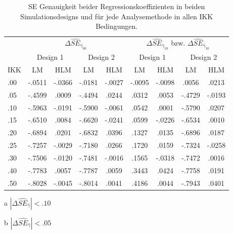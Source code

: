 \documentclass[12pt]{article}\usepackage[]{graphicx}\usepackage[]{color}
\begin{document}
\begin{table}[t!]
\centering
\begin{threeparttable}
\caption{SE Genauigkeit beider Regressionskoeffizienten in beiden Simulationsdesigns und für jede Analysemethode in allen IKK Bedingungen.}
\begin{tabular}{lcccccccc}
\toprule 
& \multicolumn{4}{c}{$\Delta\widehat{SE}_{\widehat{\gamma}_{00}}$} 
& \multicolumn{4}{c}{$\Delta\widehat{SE}_{\widehat{\gamma}_{10}}$ bzw. $\Delta\widehat{SE}_{\widehat{\gamma}_{10}}$}\\
\cmidrule(lr){2-5} \cmidrule(lr){6-9}
		& 	\multicolumn{2}{c}{Design 1} & \multicolumn{2}{c}{Design 2} 
		& \multicolumn{2}{c}{Design 1} & \multicolumn{2}{c}{Design 2}\\
			\cmidrule(lr){2-3}  \cmidrule(lr){4-5} \cmidrule(lr){6-7} \cmidrule(lr){8-9}
IKK 	& 	  LM 			&  HLM 				&  LM 				&  HLM  			&  LM 				&  HLM 				&  LM 				&  HLM\\
		 	\midrule
.00 	&   -.0511\tnote{a}	&   -.0366\tnote{b} &   -.0181\tnote{b}	& 	-.0027\tnote{b} & -.0095\tnote{b} 	& -.0098\tnote{b}	&  .0056\tnote{b} 	&  .0213\tnote{b}\\ 
.05 	&  	-.4599 			&	 .0009\tnote{b}	&	-.4494			&	 .0244\tnote{b}	&  .0312\tnote{b}	&  .0053\tnote{b}	& -.4729			& -.0193\tnote{b}\\ 
.10 	&  	-.5963			&	-.0191\tnote{b}	&	-.5900			&	-.0061\tnote{b}	&  .0542\tnote{a}	&  .0001\tnote{b}	& -.5790			&  .0207\tnote{b}\\ 
.15 	&  	-.6510			&	 .0084\tnote{b}	&	-.6620			&	-.0241\tnote{b}	&  .0599\tnote{a}	& -.0226\tnote{b}	& -.6534			&  .0010\tnote{b}\\ 
.20 	&  	-.6894			&	 .0201\tnote{b}	&	-.6832			&	 .0396\tnote{b}	&  .1327	 		&  .0135\tnote{b}	& -.6896			&  .0187\tnote{b}\\ 
.25 	&   -.7257 			&	-.0029\tnote{b}	&	-.7180			&	 .0266\tnote{b}	&  .1720	 		&  .0159\tnote{b}	& -.7324			& -.0258\tnote{b}\\ 
.30 	&   -.7506 			&	-.0120\tnote{b}	&	-.7481			&	-.0016\tnote{b}	&  .1565	 		& -.0318\tnote{b}	& -.7472			&  .0016\tnote{b}\\ 
.40 	&  	-.7783			&	 .0057\tnote{b}	&	-.7787 			&	 .0059\tnote{b}	&  .3443	 		&  .0424\tnote{b}	& -.7758			&  .0191\tnote{b}\\ 
.50 	&   -.8028 			&	-.0045\tnote{b}	&	-.8014			&	 .0041\tnote{b}	&  .4186	 		&  .0044\tnote{b}	& -.7943			&  .0401\tnote{b}\\  
\bottomrule
\end{tabular}
\label{tab:se_eff_intercept}
\begin{tablenotes}
\item [a] $|\Delta\widehat{SE}_{\widehat{\gamma}}| < .10$
\item [b] $|\Delta\widehat{SE}_{\widehat{\gamma}}| < .05$
\end{tablenotes}
\end{threeparttable}
\end{table}
\end{document}
